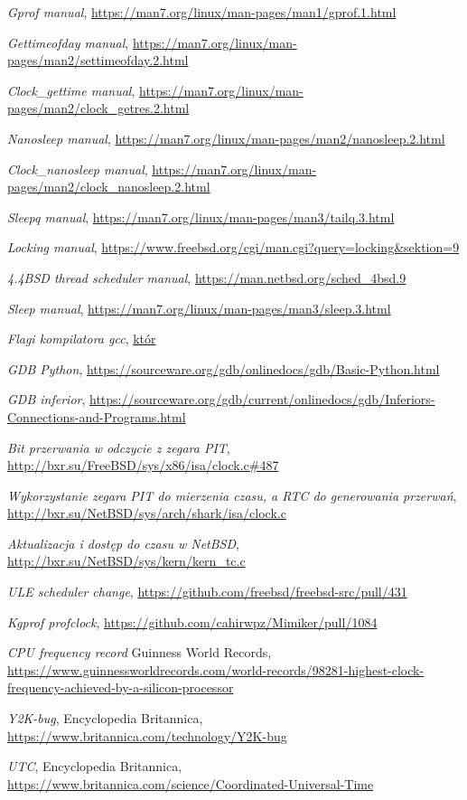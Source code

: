 \documentclass[shortabstract]{iithesis}
\theoremstyle{definition} \newtheorem*{definition}{Definicja}
\theoremstyle{definition} \newtheorem*{example}{Przykład}
\theoremstyle{definition} \newtheorem*{remark}{Uwaga}
\begin{document}
\begin{thebibliography}{100}
\textit{Gprof manual},
\url{https://man7.org/linux/man-pages/man1/gprof.1.html}

\textit{Gettimeofday manual},
\url{https://man7.org/linux/man-pages/man2/settimeofday.2.html}

\textit{Clock\_gettime manual},
\url{https://man7.org/linux/man-pages/man2/clock_getres.2.html}

\textit{Nanosleep manual},
\url{https://man7.org/linux/man-pages/man2/nanosleep.2.html}

\textit{Clock\_nanosleep manual},
\url{https://man7.org/linux/man-pages/man2/clock_nanosleep.2.html}

\textit{Sleepq manual},
\url{https://man7.org/linux/man-pages/man3/tailq.3.html}

\textit{Locking manual},
\url{https://www.freebsd.org/cgi/man.cgi?query=locking&sektion=9}

\textit{4.4BSD thread scheduler manual},
\url{https://man.netbsd.org/sched_4bsd.9}

\textit{Sleep manual},
\url{https://man7.org/linux/man-pages/man3/sleep.3.html}

\textit{Flagi kompilatora gcc},
\url{któr}

\textit{GDB Python},
\url{https://sourceware.org/gdb/onlinedocs/gdb/Basic-Python.html}

\textit{GDB inferior},
\url{https://sourceware.org/gdb/current/onlinedocs/gdb/Inferiors-Connections-and-Programs.html}

\textit{Bit przerwania w odczycie z zegara PIT},
\url{http://bxr.su/FreeBSD/sys/x86/isa/clock.c#487}

\textit{Wykorzystanie zegara PIT do mierzenia czasu, a RTC do generowania przerwań},
\url{http://bxr.su/NetBSD/sys/arch/shark/isa/clock.c}

\textit{Aktualizacja i dostęp do czasu w NetBSD},
\url{http://bxr.su/NetBSD/sys/kern/kern_tc.c}

\textit{ULE scheduler change},
\url{https://github.com/freebsd/freebsd-src/pull/431}

\textit{Kgprof profclock},
\url{https://github.com/cahirwpz/Mimiker/pull/1084}

\textit{CPU frequency record}
Guinness World Records,
\url{https://www.guinnessworldrecords.com/world-records/98281-highest-clock-frequency-achieved-by-a-silicon-processor}

\textit{Y2K-bug},
Encyclopedia Britannica,
\url{https://www.britannica.com/technology/Y2K-bug}

\textit{UTC},
Encyclopedia Britannica,
\url{https://www.britannica.com/science/Coordinated-Universal-Time}

\end{thebibliography}
\end{document}
